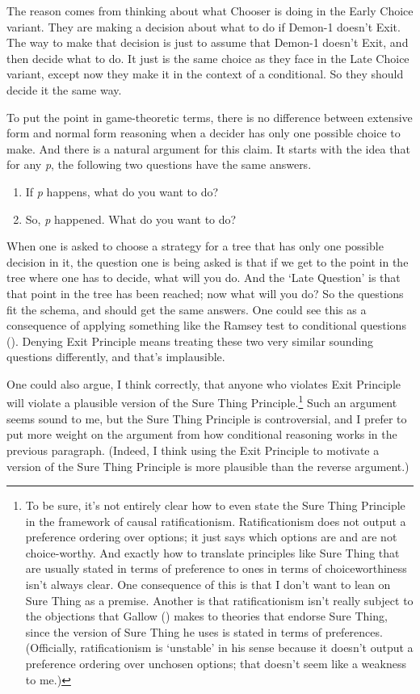 \documentclass[
  12pt,
  letterpaper,
  DIV=11,
  numbers=noendperiod]{scrreprt}
\providecommand{\tightlist}{%
  \setlength{\itemsep}{0pt}\setlength{\parskip}{0pt}}\usepackage{longtable,booktabs,array}
\begin{document}
The reason comes from thinking about what Chooser is doing in the Early
Choice variant. They are making a decision about what to do if Demon-1
doesn't Exit. The way to make that decision is just to assume that
Demon-1 doesn't Exit, and then decide what to do. It just is the same
choice as they face in the Late Choice variant, except now they make it
in the context of a conditional. So they should decide it the same way.

To put the point in game-theoretic terms, there is no difference between
extensive form and normal form reasoning when a decider has only one
possible choice to make. And there is a natural argument for this claim.
It starts with the idea that for any \emph{p}, the following two
questions have the same answers.

\begin{enumerate}
\def\labelenumi{\arabic{enumi}.}
\tightlist
\item
  If \emph{p} happens, what do you want to do?
\item
  So, \emph{p} happened. What do you want to do?
\end{enumerate}

When one is asked to choose a strategy for a tree that has only one
possible decision in it, the question one is being asked is that if we
get to the point in the tree where one has to decide, what will you do.
And the `Late Question' is that that point in the tree has been reached;
now what will you do? So the questions fit the schema, and should get
the same answers. One could see this as a consequence of applying
something like the Ramsey test to conditional questions
(). Denying Exit Principle
means treating these two very similar sounding questions differently,
and that's implausible.

One could also argue, I think correctly, that anyone who violates Exit
Principle will violate a plausible version of the Sure Thing
Principle.\footnote{To be sure, it's not entirely clear how to even
  state the Sure Thing Principle in the framework of causal
  ratificationism. Ratificationism does not output a preference ordering
  over options; it just says which options are and are not
  choice-worthy. And exactly how to translate principles like Sure Thing
  that are usually stated in terms of preference to ones in terms of
  choiceworthiness isn't always clear. One consequence of this is that I
  don't want to lean on Sure Thing as a premise. Another is that
  ratificationism isn't really subject to the objections that Gallow
  () makes to theories that endorse Sure
  Thing, since the version of Sure Thing he uses is stated in terms of
  preferences. (Officially, ratificationism is `unstable' in his sense
  because it doesn't output a preference ordering over unchosen options;
  that doesn't seem like a weakness to me.)} Such an argument seems
sound to me, but the Sure Thing Principle is controversial, and I prefer
to put more weight on the argument from how conditional reasoning works
in the previous paragraph. (Indeed, I think using the Exit Principle to
motivate a version of the Sure Thing Principle is more plausible than
the reverse argument.)
\end{document}
